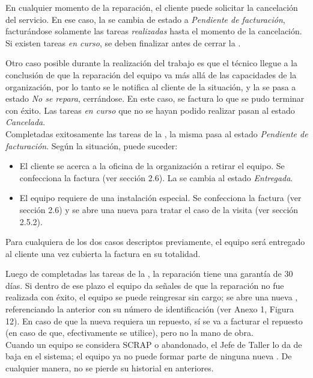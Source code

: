 \documentclass[12pt]{extarticle}
\begin{document}
\begin{spacing}{1.2}
    En cualquier momento de la reparación, el cliente puede solicitar la cancelación del servicio. En ese caso, la \OT{} se cambia de estado a \textit{Pendiente de facturación}, facturándose solamente las tareas \textit{realizadas} hasta el momento de la cancelación. Si existen tareas \textit{en curso}, se deben finalizar antes de cerrar la \OT{}.
    
    Otro caso posible durante la realización del trabajo es que el técnico llegue a la conclusión de que la reparación del equipo va más allá de las capacidades de la organización, por lo tanto se le notifica al cliente de la situación, y la \OT{} se pasa a estado \textit{No se repara}, cerrándose. En este caso, se factura lo que se pudo terminar con éxito. Las tareas \textit{en curso} que no se hayan podido realizar pasan al estado \textit{Cancelada}.\\

    Completadas exitosamente las tareas de la \OT{}, la misma pasa al estado \textit{Pendiente de facturación}. Según la situación, puede suceder:
    \begin{itemize}
        \item El cliente se acerca a la oficina de la organización a retirar el equipo. Se confecciona la factura (ver sección 2.6). La \OT{} se cambia al estado \textit{Entregada}.
        \item El equipo requiere de una instalación especial. Se confecciona la factura (ver sección 2.6) y se abre una nueva \OT{} para tratar el caso de la visita (ver sección 2.5.2).
    \end{itemize}

    Para cualquiera de los dos casos descriptos previamente, el equipo será entregado al cliente una vez cubierta la factura en su totalidad.

    Luego de completadas las tareas de la \OT{}, la reparación tiene una garantía de 30 días. Si dentro de ese plazo el equipo da señales de que la reparación no fue realizada con éxito, el equipo se puede reingresar sin cargo; se abre una nueva \OT{}, referenciando la \OT{} anterior con su número de identificación (ver Anexo 1, Figura 12). En caso de que la nueva \OT{} requiera un repuesto, sí se va a facturar el repuesto (en caso de que, efectivamente se utilice), pero no la mano de obra. \\
    
    Cuando un equipo se considera SCRAP o abandonado, el Jefe de Taller lo da de baja en el sistema; el equipo ya no puede formar parte de ninguna nueva \OT{}. De cualquier manera, no se pierde su historial en \OTs{} anteriores.


\end{spacing}
\end{document}

